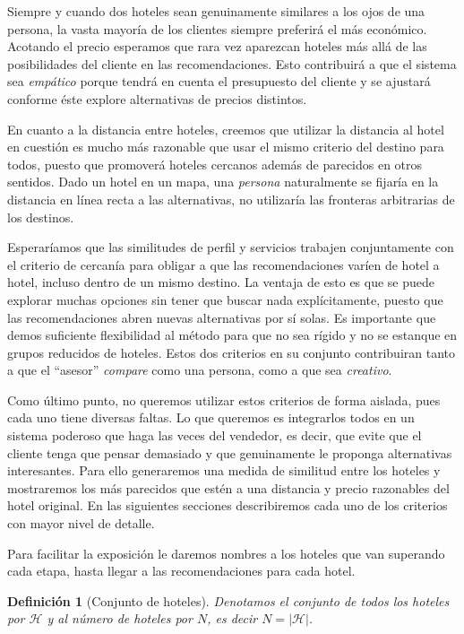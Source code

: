 \documentclass[12pt]{report}
\newcommand{\HH}{\mathcal{H}}
\newtheorem{defn}{Definici\'on}[chapter]
\begin{document}
Siempre y cuando dos hoteles sean genuinamente similares a los ojos de una persona, la vasta mayoría de los clientes siempre preferirá el más económico. Acotando el precio esperamos que rara vez aparezcan hoteles más allá de las posibilidades del cliente en las recomendaciones. Esto contribuirá a que el sistema sea \emph{empático} porque tendrá en cuenta el presupuesto del cliente y se ajustará conforme éste explore alternativas de precios distintos.

En cuanto a la distancia entre hoteles, creemos que utilizar la distancia al hotel en cuestión es mucho más razonable que usar el mismo criterio del destino para todos, puesto que promoverá hoteles cercanos además de parecidos en otros sentidos. Dado un hotel en un mapa, una \emph{persona} naturalmente se fijaría en la distancia en línea recta a las alternativas, no utilizaría las fronteras arbitrarias de los destinos.

Esperaríamos que las similitudes de perfil y servicios trabajen conjuntamente con el criterio de cercanía para obligar a que las recomendaciones varíen de hotel a hotel, incluso dentro de un mismo destino. La ventaja de esto es que se puede explorar muchas opciones sin tener que buscar nada explícitamente, puesto que las recomendaciones abren nuevas alternativas por sí solas. Es importante que demos suficiente flexibilidad al método para que no sea rígido y no se estanque en grupos reducidos de hoteles. Estos dos criterios en su conjunto contribuiran tanto a que el ``asesor'' \emph{compare} como una persona, como a que sea \emph{creativo}.

Como último punto, no queremos utilizar estos criterios de forma aislada, pues cada uno tiene diversas faltas. Lo que queremos es integrarlos todos en un sistema poderoso que haga las veces del vendedor, es decir, que evite que el cliente tenga que pensar demasiado y que genuinamente le proponga alternativas interesantes. Para ello generaremos una medida de similitud entre los hoteles y mostraremos los más parecidos que estén a una distancia y precio razonables del hotel original. En las siguientes secciones describiremos cada uno de los criterios con mayor nivel de detalle.

Para facilitar la exposición le daremos nombres a los hoteles que van superando cada etapa, hasta llegar a las recomendaciones para cada hotel.
\begin{defn}[Conjunto de hoteles]
Denotamos el conjunto de todos los hoteles por $\HH$ y al número de hoteles por $N$, es decir $N = |\HH|$.
\end{defn}
\end{document}
